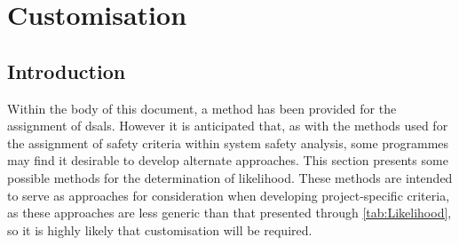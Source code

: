 %
%
\chapter{ Customisation} \label{bkm:DsalCustomisation}


\section{Introduction}
Within the body of this document, a method has been provided for the assignment of \glspl{dsal}. However it is anticipated that, as with the methods used for the assignment of safety criteria within system safety analysis, some programmes may find it desirable to develop alternate approaches. This section presents some possible methods for the determination of likelihood. These methods are intended to serve as approaches for consideration when developing project-specific criteria, as these approaches are less generic than that presented through \autoref {tab:Likelihood}, so it is highly likely that customisation will be required.

